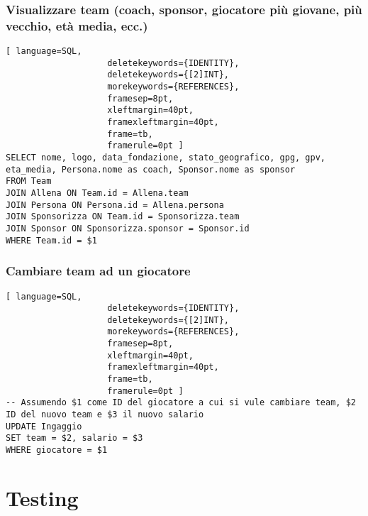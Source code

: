 \documentclass{article}
\begin{document}
\subsubsection{Visualizzare team (coach, sponsor, giocatore più giovane, più vecchio, età media, ecc.)}
\begin{lstlisting}[ language=SQL,
                    deletekeywords={IDENTITY},
                    deletekeywords={[2]INT},
                    morekeywords={REFERENCES},
                    framesep=8pt,
                    xleftmargin=40pt,
                    framexleftmargin=40pt,
                    frame=tb,
                    framerule=0pt ]
SELECT nome, logo, data_fondazione, stato_geografico, gpg, gpv, eta_media, Persona.nome as coach, Sponsor.nome as sponsor
FROM Team
JOIN Allena ON Team.id = Allena.team
JOIN Persona ON Persona.id = Allena.persona
JOIN Sponsorizza ON Team.id = Sponsorizza.team
JOIN Sponsor ON Sponsorizza.sponsor = Sponsor.id
WHERE Team.id = $1
\end{lstlisting}

\subsubsection{Cambiare team ad un giocatore}
\begin{lstlisting}[ language=SQL,
                    deletekeywords={IDENTITY},
                    deletekeywords={[2]INT},
                    morekeywords={REFERENCES},
                    framesep=8pt,
                    xleftmargin=40pt,
                    framexleftmargin=40pt,
                    frame=tb,
                    framerule=0pt ]
-- Assumendo $1 come ID del giocatore a cui si vule cambiare team, $2 ID del nuovo team e $3 il nuovo salario
UPDATE Ingaggio
SET team = $2, salario = $3
WHERE giocatore = $1
\end{lstlisting}

\section{Testing}
\end{document}
